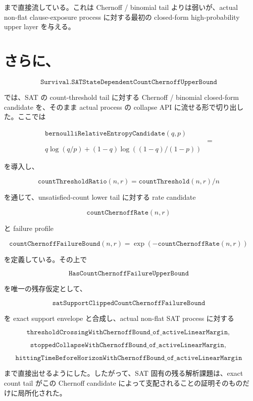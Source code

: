 \documentclass[12pt,a4paper]{article}
\begin{document}
まで直接流している。これは Chernoff / binomial tail よりは弱いが、actual non-flat clause-exposure process に対する最初の closed-form high-probability upper layer を与える。

\section{さらに、}\label{ux3055ux3089ux306b-27}

\[
\texttt{Survival.SATStateDependentCountChernoffUpperBound}
\]

では、SAT の count-threshold tail に対する Chernoff / binomial closed-form candidate を、そのまま actual process の collapse API に流せる形で切り出した。ここでは

\[
\begin{aligned}
\texttt{bernoulliRelativeEntropyCandidate}(q,p) \\
&= \\
q\log(q/p)+(1-q)\log((1-q)/(1-p))
\end{aligned}
\]

を導入し、

\[
\texttt{countThresholdRatio}(n,r)=\texttt{countThreshold}(n,r)/n
\]

を通じて、unsatisfied-count lower tail に対する rate candidate

\[
\texttt{countChernoffRate}(n,r)
\]

と failure profile

\[
\texttt{countChernoffFailureBound}(n,r)=\exp(-\texttt{countChernoffRate}(n,r))
\]

を定義している。その上で

\[
\texttt{HasCountChernoffFailureUpperBound}
\]

を唯一の残存仮定として、

\[
\texttt{satSupportClippedCountChernoffFailureBound}
\]

を exact support envelope と合成し、actual non-flat SAT process に対する

\[
\texttt{thresholdCrossingWithChernoffBound\_of\_activeLinearMargin},
\]

\[
\texttt{stoppedCollapseWithChernoffBound\_of\_activeLinearMargin},
\]

\[
\texttt{hittingTimeBeforeHorizonWithChernoffBound\_of\_activeLinearMargin}
\]

まで直接出せるようにした。したがって、SAT 固有の残る解析課題は、exact count tail がこの Chernoff candidate によって支配されることの証明そのものだけに局所化された。
\end{document}
